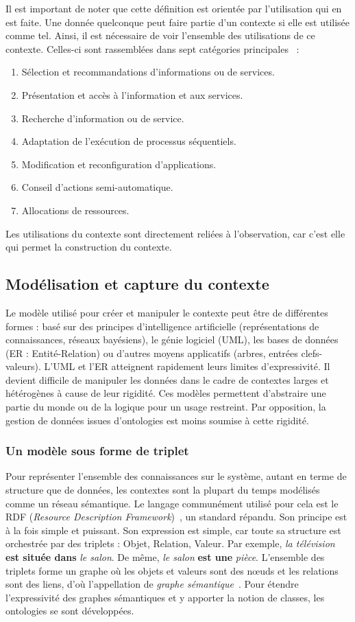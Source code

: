 Il est important de noter que cette définition est orientée par l'utilisation qui en est faite. Une donnée quelconque peut faire partie d'un contexte si elle est utilisée comme tel. Ainsi, il est nécessaire de voir l'ensemble des utilisations de ce contexte. Celles-ci sont rassemblées dans sept catégories principales~\cite{Soylu:context} : 
\begin{enumerate}
	\item Sélection et recommandations d'informations ou de services.
	\item Présentation et accès à l'information et aux services.
	\item Recherche d'information ou de service.
	\item Adaptation de l'exécution de processus séquentiels.
	\item Modification et reconfiguration d'applications.
	\item Conseil d'actions semi-automatique.
	\item Allocations de ressources.
\end{enumerate}
Les utilisations du contexte sont directement reliées à l'observation, car c'est elle qui permet la construction du contexte.

\subsection{Modélisation et capture du contexte}
Le modèle utilisé pour créer et manipuler le contexte peut être de différentes formes : basé sur des principes d'intelligence artificielle (représentations de connaissances, réseaux bayésiens), le génie logiciel (UML), les bases de données (ER : Entité-Relation) ou d'autres moyens applicatifs (arbres, entrées clefs-valeurs). L'UML et l'ER atteignent rapidement leurs limites d'expressivité. Il devient difficile de manipuler les données dans le cadre de contextes larges et hétérogènes à cause de leur rigidité. Ces modèles permettent d'abstraire une partie du monde ou de la logique pour un usage restreint. Par opposition, la gestion de données issues d'ontologies est moins soumise à cette rigidité.

\subsubsection{Un modèle sous forme de triplet}
Pour représenter l'ensemble des connaissances sur le système, autant en terme de structure que de données, les contextes sont la plupart du temps modélisés comme un réseau sémantique. Le langage communément utilisé pour cela est le RDF (\textit{Resource Description Framework})~\cite{W3C:RDF}, un standard répandu. Son principe est à la fois simple et puissant. Son expression est simple, car toute sa structure est orchestrée par des triplets : Objet, Relation, Valeur. Par exemple, \textit{la télévision} \textbf{est située dans} \textit{le salon}. De même, \textit{le salon} \textbf{est une} \textit{pièce}. L'ensemble des triplets forme un graphe où les objets et valeurs sont des nœuds et les relations sont des liens, d'où l'appellation de \textit{graphe sémantique}~\cite{Minsky:knowledge}. Pour étendre l'expressivité des graphes sémantiques et y apporter la notion de classes, les ontologies se sont développées.

